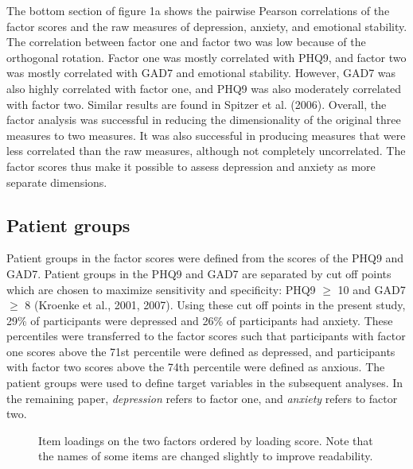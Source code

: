 \documentclass[11pt, a4paper]{article}
\begin{document}
The bottom section of figure 1a shows the pairwise Pearson correlations of the factor scores and the raw measures of depression, anxiety, and emotional stability. The correlation between factor one and factor two was low because of the orthogonal rotation. Factor one was mostly correlated with PHQ9, and factor two was mostly correlated with GAD7 and emotional stability. However, GAD7 was also highly correlated with factor one, and PHQ9 was also moderately correlated with factor two. Similar results are found in Spitzer et al. (2006). Overall, the factor analysis was successful in reducing the dimensionality of the original three measures to two measures. It was also successful in producing measures that were less correlated than the raw measures, although not completely uncorrelated. The factor scores thus make it possible to assess depression and anxiety as more separate dimensions.


\subsection{Patient groups}
Patient groups in the factor scores were defined from the scores of the PHQ9 and GAD7. Patient groups in the PHQ9 and GAD7 are separated by cut off points which are chosen to maximize sensitivity and specificity: PHQ9 $\geq$ 10 and GAD7 $\geq$ 8 (Kroenke et al., 2001, 2007). Using these cut off points in the present study, 29\% of participants were depressed and 26\% of participants had anxiety. These percentiles were transferred to the factor scores such that participants with factor one scores above the 71st percentile were defined as depressed, and participants with factor two scores above the 74th percentile were defined as anxious. The patient groups were used to define target variables in the subsequent analyses. In the remaining paper, \textit{depression} refers to factor one, and \textit{anxiety} refers to factor two.

 
\begin{figure}
\centering
\vspace{-2cm}

\caption{\label{fig:data} Item loadings on the two factors ordered by loading score. Note that the names of some items are changed slightly to improve readability.}
\end{figure}


\newpage
\end{document}
